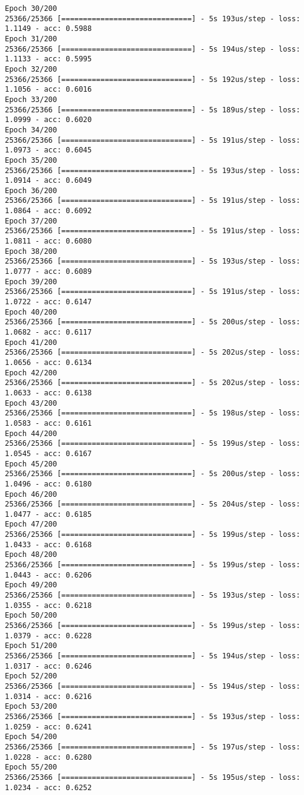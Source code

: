 \documentclass[11pt]{article}
\begin{document}
\begin{Verbatim}[commandchars=\\\{\}]
Epoch 30/200
25366/25366 [==============================] - 5s 193us/step - loss: 1.1149 - acc: 0.5988
Epoch 31/200
25366/25366 [==============================] - 5s 194us/step - loss: 1.1133 - acc: 0.5995
Epoch 32/200
25366/25366 [==============================] - 5s 192us/step - loss: 1.1056 - acc: 0.6016
Epoch 33/200
25366/25366 [==============================] - 5s 189us/step - loss: 1.0999 - acc: 0.6020
Epoch 34/200
25366/25366 [==============================] - 5s 191us/step - loss: 1.0973 - acc: 0.6045
Epoch 35/200
25366/25366 [==============================] - 5s 193us/step - loss: 1.0914 - acc: 0.6049
Epoch 36/200
25366/25366 [==============================] - 5s 191us/step - loss: 1.0864 - acc: 0.6092
Epoch 37/200
25366/25366 [==============================] - 5s 191us/step - loss: 1.0811 - acc: 0.6080
Epoch 38/200
25366/25366 [==============================] - 5s 193us/step - loss: 1.0777 - acc: 0.6089
Epoch 39/200
25366/25366 [==============================] - 5s 191us/step - loss: 1.0722 - acc: 0.6147
Epoch 40/200
25366/25366 [==============================] - 5s 200us/step - loss: 1.0682 - acc: 0.6117
Epoch 41/200
25366/25366 [==============================] - 5s 202us/step - loss: 1.0656 - acc: 0.6134
Epoch 42/200
25366/25366 [==============================] - 5s 202us/step - loss: 1.0633 - acc: 0.6138
Epoch 43/200
25366/25366 [==============================] - 5s 198us/step - loss: 1.0583 - acc: 0.6161
Epoch 44/200
25366/25366 [==============================] - 5s 199us/step - loss: 1.0545 - acc: 0.6167
Epoch 45/200
25366/25366 [==============================] - 5s 200us/step - loss: 1.0496 - acc: 0.6180
Epoch 46/200
25366/25366 [==============================] - 5s 204us/step - loss: 1.0477 - acc: 0.6185
Epoch 47/200
25366/25366 [==============================] - 5s 199us/step - loss: 1.0433 - acc: 0.6168
Epoch 48/200
25366/25366 [==============================] - 5s 199us/step - loss: 1.0443 - acc: 0.6206
Epoch 49/200
25366/25366 [==============================] - 5s 193us/step - loss: 1.0355 - acc: 0.6218
Epoch 50/200
25366/25366 [==============================] - 5s 199us/step - loss: 1.0379 - acc: 0.6228
Epoch 51/200
25366/25366 [==============================] - 5s 194us/step - loss: 1.0317 - acc: 0.6246
Epoch 52/200
25366/25366 [==============================] - 5s 194us/step - loss: 1.0314 - acc: 0.6216
Epoch 53/200
25366/25366 [==============================] - 5s 193us/step - loss: 1.0259 - acc: 0.6241
Epoch 54/200
25366/25366 [==============================] - 5s 197us/step - loss: 1.0228 - acc: 0.6280
Epoch 55/200
25366/25366 [==============================] - 5s 195us/step - loss: 1.0234 - acc: 0.6252

\end{Verbatim}
\end{document}
